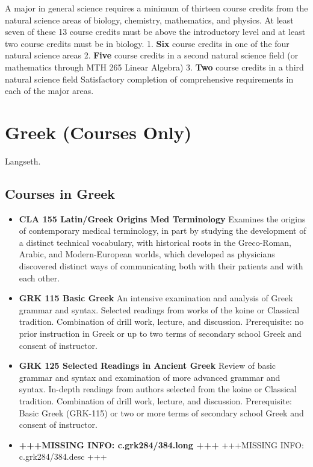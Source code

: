 \documentclass[
  letterpaper,
]{scrbook}
\providecommand{\tightlist}{%
  \setlength{\itemsep}{0pt}\setlength{\parskip}{0pt}}
\begin{document}
A major in general science requires a minimum of thirteen course credits
from the natural science areas of biology, chemistry, mathematics, and
physics. At least seven of these 13 course credits must be above the
introductory level and at least two course credits must be in biology.
1. \textbf{Six} course credits in one of the four natural science areas
2. \textbf{Five} course credits in a second natural science field (or
mathematics through MTH 265 Linear Algebra) 3. \textbf{Two} course
credits in a third natural science field Satisfactory completion of
comprehensive requirements in each of the major areas.

\section{Greek (Courses Only)}\label{sec-greek}

Langseth.

\subsection{Courses in Greek}\label{courses-in-greek}

\begin{itemize}
\tightlist
\item
  \textbf{CLA 155 Latin/Greek Origins Med Terminology} Examines the
  origins of contemporary medical terminology, in part by studying the
  development of a distinct technical vocabulary, with historical roots
  in the Greco-Roman, Arabic, and Modern-European worlds, which
  developed as physicians discovered distinct ways of communicating both
  with their patients and with each other.
\item
  \textbf{GRK 115 Basic Greek} An intensive examination and analysis of
  Greek grammar and syntax. Selected readings from works of the koine or
  Classical tradition. Combination of drill work, lecture, and
  discussion. Prerequisite: no prior instruction in Greek or up to two
  terms of secondary school Greek and consent of instructor.
\item
  \textbf{GRK 125 Selected Readings in Ancient Greek} Review of basic
  grammar and syntax and examination of more advanced grammar and
  syntax. In-depth readings from authors selected from the koine or
  Classical tradition. Combination of drill work, lecture, and
  discussion. Prerequisite: Basic Greek (GRK-115) or two or more terms
  of secondary school Greek and consent of instructor.
\item
  \textbf{+++MISSING INFO: c.grk284/384.long +++} +++MISSING INFO:
  c.grk284/384.desc +++
\end{itemize}
\end{document}
